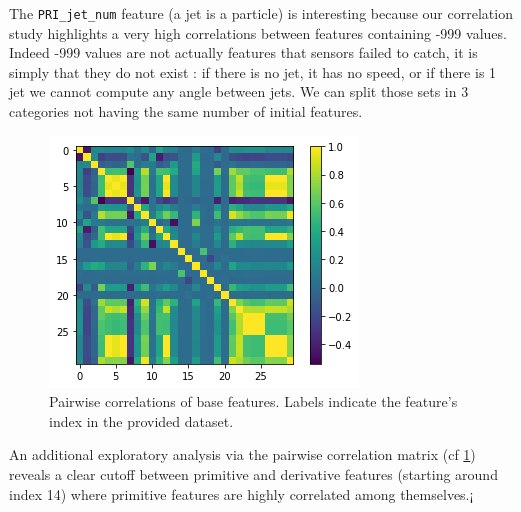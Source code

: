 \documentclass[10pt,conference,compsocconf]{IEEEtran}
\begin{document}

The \verb+PRI_jet_num+ feature (a jet is a particle) is interesting because our correlation study highlights a very high correlations between features containing -999 values. Indeed -999 values are not actually features that sensors failed to catch, it is simply that they do not exist : if there is no jet, it has no speed, or if there is 1 jet we cannot compute any angle between jets. We can split those sets in 3 categories not having the same number of initial features.\\

\begin{figure}[H]
\centering
\includegraphics[width=\linewidth]{corr.png}

\cprotect\caption{Pairwise correlations of base features. Labels indicate the feature's index in the provided dataset. }
\label{fig_corr}
\end{figure}

An additional exploratory analysis via the pairwise correlation matrix (cf \ref{fig_corr}) reveals a clear cutoff between primitive and derivative features (starting around index 14) where  primitive features are highly correlated among themselves.¡
\end{document}
